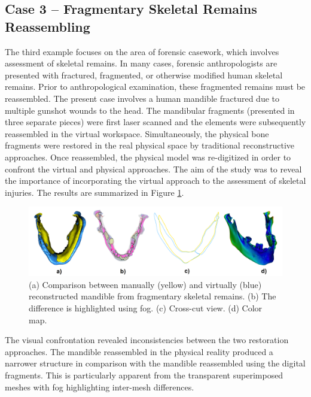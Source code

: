 \documentclass[final,5p,times]{elsarticle}
\begin{document}
\subsection{Case 3 -- Fragmentary Skeletal Remains Reassembling}
\begin{sloppypar}
The third example focuses on the area of forensic casework, which involves assessment of skeletal remains. 
In many cases, forensic anthropologists are presented with fractured, fragmented, or otherwise modified human skeletal remains. 
Prior to anthropological examination, these fragmented remains must be reassembled. 
The present case involves a human mandible fractured due to multiple gunshot wounds to the head. 
The mandibular fragments (presented in three separate pieces) were first laser scanned and the elements were subsequently reassembled in the virtual workspace.
Simultaneously, the physical bone fragments were restored in the real physical space by traditional reconstructive approaches.
Once reassembled, the physical model was re-digitized in order to confront the virtual and physical approaches. 
The aim of the study was to reveal the importance of incorporating the virtual approach to the assessment of skeletal injuries. 
The results are summarized in Figure \ref{fig:case3}.
\end{sloppypar}

\begin{figure}[htb]
	\centering
  \includegraphics[width=0.9\linewidth]{pictures/case3.png}
  \caption{\label{fig:case3} (a) Comparison between manually (yellow) and virtually (blue) reconstructed mandible from fragmentary skeletal remains. (b) The difference is highlighted using fog. (c) Cross-cut view. (d) Color map.}
\end{figure}

The visual confrontation revealed inconsistencies between the two restoration approaches. 
The mandible reassembled in the physical reality produced a narrower structure in comparison with the mandible reassembled using the digital fragments. 
This is particularly apparent from the transparent superimposed meshes with fog highlighting inter-mesh differences. 
 
\end{document}
